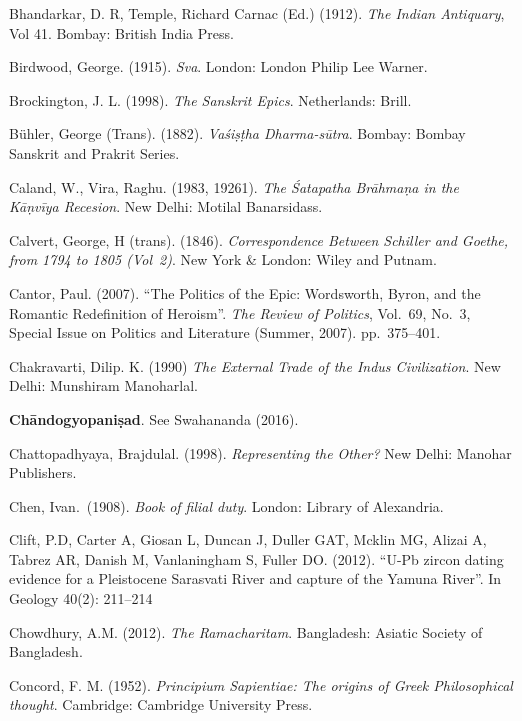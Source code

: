 \begin{thebibliography}{99}
Bhandarkar, D. R, Temple, Richard Carnac (Ed.) (1912). {\sl The Indian Antiquary}, Vol 41. Bombay: British India Press. 

Birdwood, George. (1915). {\sl Sva}. London: London Philip Lee Warner. 


Brockington, J. L. (1998). {\sl The Sanskrit Epics}. Netherlands: Brill.

Bühler, George (Trans). (1882). {\sl Vaśiṣṭha Dharma-sūtra}. Bombay: Bombay Sanskrit and Prakrit Series. 

Caland, W., Vira, Raghu. (1983, 19261). {\sl The Śatapatha Brāhmaṇa in the Kāṇvīya Recesion}. New Delhi: Motilal Banarsidass. 

Calvert, George, H (trans). (1846). {\sl Correspondence Between Schiller and Goethe, from 1794 to 1805 (Vol~2)}. New York \& London: Wiley and Putnam.  

Cantor, Paul. (2007). “The Politics of the Epic: Wordsworth, Byron, and the Romantic Redefinition of Heroism”. {\sl The Review of Politics}, Vol.~69, No.~3, Special Issue on Politics and Literature (Summer, 2007). pp.~375--401.

Chakravarti, Dilip. K. (1990) {\sl The External Trade of the Indus Civilization}. New Delhi: Munshiram Manoharlal. 

{\bf Chāndogyopaniṣad}. See Swahananda (2016).

Chattopadhyaya, Brajdulal. (1998). {\sl Representing the Other?} New Delhi: Manohar Publishers. 

Chen, Ivan.\ (1908). {\sl Book of filial duty}. London: Library of Alexandria. 

Clift, P.D, Carter A, Giosan L, Duncan J, Duller GAT, Mcklin MG, Alizai A, Tabrez AR, Danish M, Vanlaningham S, Fuller DO. (2012). “U-Pb zircon dating evidence for a Pleistocene Sarasvati River and capture of the Yamuna River”. In Geology 40(2): 211--214

Chowdhury, A.M. (2012). {\sl The Ramacharitam}. Bangladesh: Asiatic Society of Bangladesh. 

Concord, F. M. (1952). {\sl Principium Sapientiae: The origins of Greek Philosophical thought}. Cambridge: Cambridge University Press. 


\end{thebibliography}
